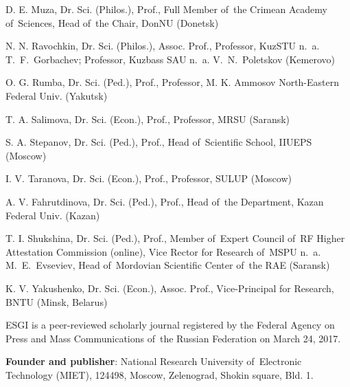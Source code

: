 \begin{otherlanguage}{english}
\begin{multicols}{2}
\begin{flushleft}
\noindent D. E. Muza, Dr. Sci. (Philos.), Prof., Full Member of the Crimean Academy of Sciences, Head of the Chair, DonNU (Donetsk)

\noindent N. N. Ravochkin, Dr. Sci. (Philos.), Assoc. Prof., Professor, KuzSTU n. a. T. F. Gorbachev; Professor, Kuzbass SAU n. a. V. N. Poletskov (Kemerovo)

\noindent O. G. Rumba, Dr. Sci. (Ped.), Prof., Professor, M. K. Ammosov North-Eastern Federal Univ. (Yakutsk)

\noindent T. A. Salimova, Dr. Sci. (Econ.), Prof., Professor, MRSU (Saransk)

\noindent S. A. Stepanov, Dr. Sci. (Ped.), Prof., Head of Scientific School, IIUEPS (Moscow)

\noindent I. V. Taranova, Dr. Sci. (Econ.), Prof., Professor, SULUP (Moscow)

\noindent A. V. Fahrutdinova, Dr. Sci. (Ped.), Prof., Head of the Department, Kazan Federal Univ. (Kazan)

\noindent T. I. Shukshina, Dr. Sci. (Ped.), Prof., Member of Expert Council of RF Higher Attestation Commission (online), Vice Rector for Research of MSPU n. a. M. E. Evseviev, Head of Mordovian Scientific Center of the RAE (Saransk)

\noindent K. V. Yakushenko, Dr. Sci. (Econ.), Assoc. Prof., Vice-Principal for Research, BNTU (Minsk, Belarus)

   \end{flushleft}    
\end{multicols}

\begin{flushleft}
\footnotesize
ESGI is a peer-reviewed scholarly journal registered by the Federal Agency on Press and Mass Communications
of the Russian Federation on March 24, 2017.

\vspace{1em}
\textbf{Founder and publisher}: National Research University of Electronic Technology (MIET), 124498, Moscow,
Zelenograd, Shokin square, Bld. 1.
\end{flushleft}

\noindent
\begin{minipage}[t]{.48\textwidth}
    

\end{minipage}
\end{otherlanguage}
